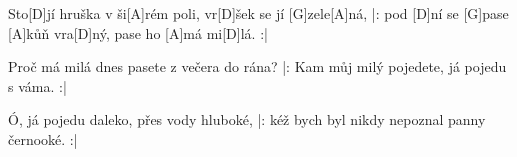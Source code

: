 
\sloka
Sto[D]jí hruška v ši[A]rém poli, vr[D]šek se jí [G]zele[A]ná,
|: pod [D]ní se [G]pase [A]kůň vra[D]ný, pase ho [A]má mi[D]lá. :|

\sloka
Proč má milá dnes pasete z večera do rána?
|: Kam můj milý pojedete, já pojedu s váma. :|

\sloka
Ó, já pojedu daleko, přes vody hluboké,
|: kéž bych byl nikdy nepoznal panny černooké. :|
